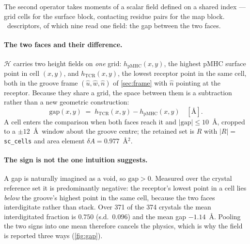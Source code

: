 \documentclass[11pt,a4paper]{article}
\newcommand{\dsc}[1]{\texttt{#1}}
\newcommand{\obj}[1]{\ensuremath{\mathcal{#1}}}
\begin{document}
The second operator takes moments of a scalar field defined on a shared index --- grid cells for the
surface block, contacting residue pairs for the map block. \nOpMoment\ descriptors, of which nine
read one field: the gap between the two faces.

\paragraph{The two faces and their difference.} \obj{H} carries two height fields on \emph{one}
grid: $h_{\mathrm{pMHC}}(x,y)$, the highest pMHC surface point in cell $(x,y)$, and
$h_{\mathrm{TCR}}(x,y)$, the lowest receptor point in the same cell, both in the groove frame
$(\hat u, \hat w, \hat n)$ of \cref{sec:frame} with $\hat n$ pointing at the receptor. Because they
share a grid, the space between them is a subtraction rather than a new geometric construction:
%
\begin{equation}
\mathrm{gap}(x,y) \;=\; h_{\mathrm{TCR}}(x,y) - h_{\mathrm{pMHC}}(x,y) \quad [\text{\AA}].
\label{eq:gap}
\end{equation}
%
A cell enters the comparison when both faces reach it and $|\mathrm{gap}| \le 10$~\AA, cropped to a
$\pm 12$~\AA\ window about the groove centre; the retained set is $R$ with $|R| =$ \dsc{sc\_cells}
and area element $\delta A = 0.977$~\AA$^2$.

\paragraph{The sign is not the one intuition suggests.} A gap is naturally imagined as a void, so
$\mathrm{gap} > 0$. Measured over the crystal reference set it is predominantly negative: the
receptor's lowest point in a cell lies \emph{below} the groove's highest point in the same cell,
because the two faces interdigitate rather than stack. Over 371 of the 374 crystals the mean
interdigitated fraction is $0.750$ (s.d.\ $0.096$) and the mean gap $-1.14$~\AA. Pooling the two
signs into one mean therefore cancels the physics, which is why the field is reported three ways
(\cref{fig:gap}).
\end{document}
